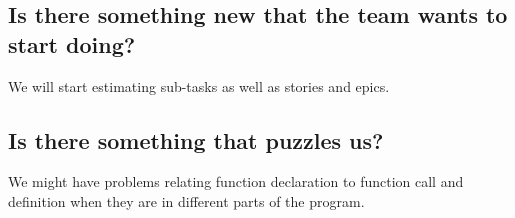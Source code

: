 \subsection*{Is there something new that the team wants to start doing?}
We will start estimating sub-tasks as well as stories and epics.

\subsection*{Is there something that puzzles us?}
We might have problems relating function declaration to function call and definition when they are in different parts of the program. 

\newpage
